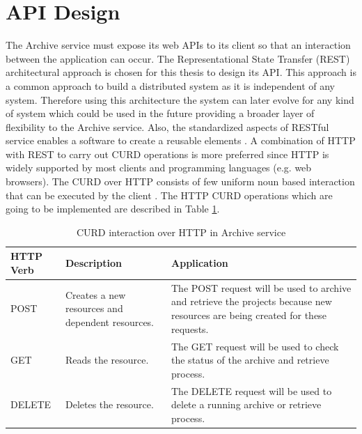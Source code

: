 \section{API Design}
\label{section:APIDesign}
    The Archive service must expose its web APIs to its client so that an interaction between the application can occur.
    The Representational State Transfer (REST) \cite[Chapter.~5]{REST} architectural approach is chosen for this thesis
    to design its API. This approach is a 
    common approach to build a distributed system as it is independent of any system. Therefore using this architecture the system can later 
    evolve for any kind of system which could be used in the future providing a broader layer of flexibility to the Archive service. 
    Also, the standardized aspects of RESTful service enables a software to create a reusable elements \cite{RESTThesis}. A combination of HTTP with REST to carry out
    CURD operations is more preferred since HTTP is widely supported by most clients and programming languages (e.g. web browsers).
    The CURD over HTTP consists of few uniform noun based interaction that can be executed by the client \cite[p.~13]{RESTThesis}. The
    HTTP CURD operations which are going to be implemented are described in Table \ref{table:curdHttp}.

    \begin{table}[h!]
        \centering
        \begin{tabular}{|p{2cm}|p{4cm}|p{7cm}|}
            \hline
                \textbf{HTTP Verb}  & \textbf{Description} & \textbf{Application}\\
            \hline
                POST & 
                Creates a new resources and dependent resources.
                & The POST request will be used to archive and retrieve the projects because new resources are being created for these requests.\\
            \hline
                GET & Reads the resource. & The GET request will be used to check the status of the archive and retrieve process. \\
            \hline
                DELETE & Deletes the resource. & The DELETE request will be used to delete a running archive or retrieve process. \\                
            \hline
        \end{tabular}
        \caption{CURD interaction over HTTP in Archive service}
        \label{table:curdHttp}     
    \end{table}   
    
